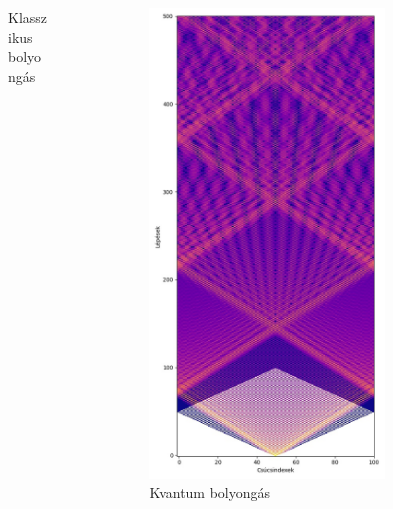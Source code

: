 \documentclass[aspectratio=169]{beamer}
\begin{document}
\begin{frame}
\begin{columns}[onlytextwidth]
\begin{column}{.25\textwidth}
\begin{figure}
        \caption{\hspace{0.28cm}Klasszikus bolyongás}
      \end{figure}
    \end{column}
    \begin{column}{.25\textwidth}
      \begin{figure}
        \includegraphics[width=0.9\textwidth]{./figures/quantum_simulation_long.jpg}
        \caption{\hspace{0.28cm}Kvantum bolyongás}
      \end{figure}
    \end{column}
    \begin{column}{.25\textwidth}
    \end{column}
  \end{columns}
\end{frame}
\end{document}
